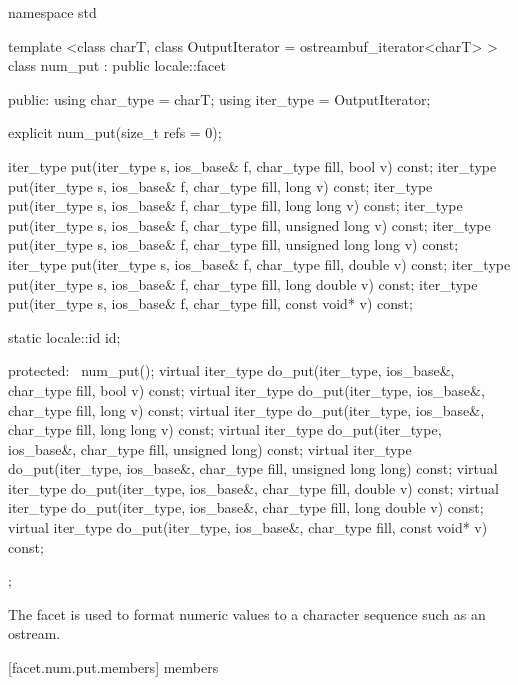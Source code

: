 %
\begin{codeblock}
namespace std {
  template <class charT, class OutputIterator = ostreambuf_iterator<charT> >
  class num_put : public locale::facet {
  public:
    using char_type = charT;
    using iter_type = OutputIterator;

    explicit num_put(size_t refs = 0);

    iter_type put(iter_type s, ios_base& f, char_type fill, bool v) const;
    iter_type put(iter_type s, ios_base& f, char_type fill, long v) const;
    iter_type put(iter_type s, ios_base& f, char_type fill, long long v) const;
    iter_type put(iter_type s, ios_base& f, char_type fill,
                  unsigned long v) const;
    iter_type put(iter_type s, ios_base& f, char_type fill,
                  unsigned long long v) const;
    iter_type put(iter_type s, ios_base& f, char_type fill,
                  double v) const;
    iter_type put(iter_type s, ios_base& f, char_type fill,
                  long double v) const;
    iter_type put(iter_type s, ios_base& f, char_type fill,
                  const void* v) const;

    static locale::id id;

  protected:
    ~num_put();
    virtual iter_type do_put(iter_type, ios_base&, char_type fill,
                             bool v) const;
    virtual iter_type do_put(iter_type, ios_base&, char_type fill,
                             long v) const;
    virtual iter_type do_put(iter_type, ios_base&, char_type fill,
                             long long v) const;
    virtual iter_type do_put(iter_type, ios_base&, char_type fill,
                             unsigned long) const;
    virtual iter_type do_put(iter_type, ios_base&, char_type fill,
                             unsigned long long) const;
    virtual iter_type do_put(iter_type, ios_base&, char_type fill,
                             double v) const;
    virtual iter_type do_put(iter_type, ios_base&, char_type fill,
                             long double v) const;
    virtual iter_type do_put(iter_type, ios_base&, char_type fill,
                             const void* v) const;
  };
}
\end{codeblock}

\pnum
The facet
is used to format numeric values to a character sequence such as an ostream.

[facet.num.put.members]{ members}

